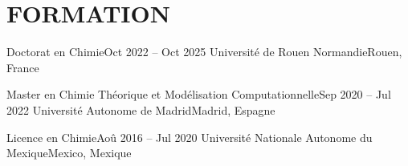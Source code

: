 \section{FORMATION}
\resumeSubHeadingListStart

  \resumeSubheading
    {Doctorat en Chimie}{Oct 2022 -- Oct 2025}
    {Université de Rouen Normandie}{Rouen, France}
  \resumeItemListStart
  \resumeItemListEnd

  \resumeSubheading
    {Master en Chimie Théorique et Modélisation Computationnelle}{Sep 2020 -- Jul 2022}
    {Université Autonome de Madrid}{Madrid, Espagne}
  \resumeItemListStart
  \resumeItemListEnd

  \resumeSubheading
    {Licence en Chimie}{Aoû 2016 -- Jul 2020}
    {Université Nationale Autonome du Mexique}{Mexico, Mexique}
  \resumeItemListStart
  \resumeItemListEnd

\resumeSubHeadingListEnd
